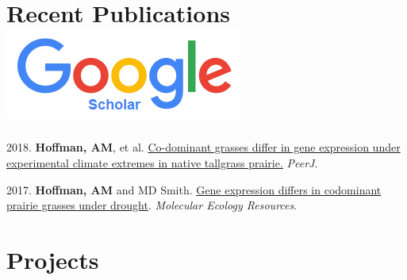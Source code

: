 \documentclass[letterpaper]{twentysecondcv} %
\begin{document}
\section{Recent Publications  \href{https://scholar.google.com/citations?user=k6RyLHsAAAAJ&hl=en}{{\includegraphics[scale=0.18]{img/Google_Scholar_logo_2015.png}} } }
2018. \textbf{Hoffman, AM}, et al. \href{https://peerj.com/articles/4394.pdf}{Co-dominant grasses differ in gene expression under experimental climate extremes in native tallgrass prairie.} \textit{PeerJ}.\\
\vspace{-2mm}

2017. \textbf{Hoffman, AM} and MD Smith. \href{http://onlinelibrary.wiley.com/doi/10.1111/1755-0998.12733/full}{Gene expression differs in codominant prairie grasses under drought}. \textit{Molecular Ecology Resources}.\\



\section{Projects}
\end{document}

